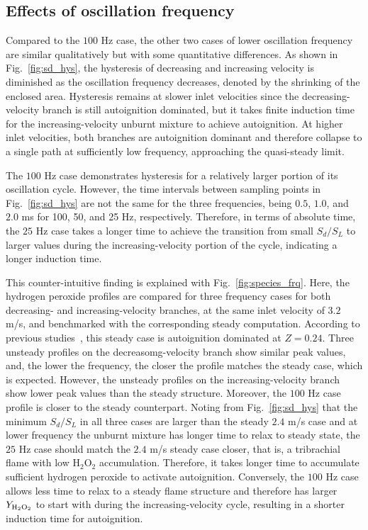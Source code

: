 \documentclass[review,3p,times]{elsarticle}
\begin{document}
\subsection{Effects of oscillation frequency}

Compared to the $100$ Hz case, the other two cases of lower oscillation frequency are similar qualitatively but with some quantitative differences.  As shown in Fig.~\ref{fig:sd_hys}, the hysteresis of decreasing and increasing velocity is diminished as the oscillation frequency decreases, denoted by the shrinking of the enclosed area.  Hysteresis remains at slower inlet velocities since the decreasing-velocity branch is still autoignition dominated, but it takes finite induction time for the increasing-velocity unburnt mixture to achieve autoignition.  At higher inlet velocities, both branches are autoignition dominant and therefore collapse to a single path at sufficiently low frequency, approaching the quasi-steady limit.

The $100$ Hz case demonstrates hysteresis for a relatively larger portion of its oscillation cycle.  However, the time intervals between sampling points in Fig.~\ref{fig:sd_hys} are not the same for the three frequencies, being $0.5$, $1.0$, and $2.0$ ms for 100, 50, and 25 Hz, respectively. Therefore, in terms of absolute time, the $25$ Hz case takes a longer time to achieve the transition from small $S_d/S_L$ to larger values during the increasing-velocity portion of the cycle, indicating a longer induction time.  

This counter-intuitive finding is explained with Fig.~\ref{fig:species_frq}.  Here, the hydrogen peroxide profiles are compared for three frequency cases for both decreasing- and increasing-velocity branches, at the same inlet velocity of $3.2$ m/s, and benchmarked with the corresponding steady computation.  According to previous studies~\cite{deng15,deng15b}, this steady case is autoignition dominated at $Z = 0.24$.  Three unsteady profiles on the decreasomg-velocity branch show similar peak values, and, the lower the frequency, the closer the profile matches the steady case, which is expected.  However, the unsteady profiles on the increasing-velocity branch show lower peak values than the steady structure.  Moreover, the $100$ Hz case profile is closer to the steady counterpart.  Noting from Fig.~\ref{fig:sd_hys} that the minimum $S_d/S_L$ in all three cases are larger than the steady $2.4$ m/s case and at lower frequency the unburnt mixture has longer time to relax to steady state, the $25$ Hz case should match the $2.4$ m/s steady case closer, that is, a tribrachial flame with low H$_2$O$_2$ accumulation.  Therefore, it takes longer time to accumulate sufficient hydrogen peroxide to activate autoignition.  Conversely, the $100$ Hz case allows less time to relax to a steady flame structure and therefore has larger $Y_{\rm H_2O_2}$ to start with during the increasing-velocity cycle, resulting in a shorter induction time for autoignition.
\end{document}
